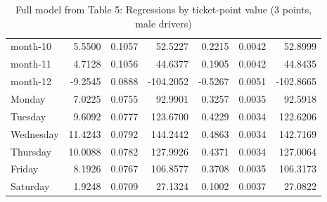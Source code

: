 \documentclass[10pt]{article}
\begin{document}
\begin{table}[ht]
\begin{tabular}{lrrrrrr}
  month-10 & 5.5500 & 0.1057 & 52.5227 & 0.2215 & 0.0042 & 52.8999 \\ 
  month-11 & 4.7128 & 0.1056 & 44.6377 & 0.1905 & 0.0042 & 44.8435 \\ 
  month-12 & -9.2545 & 0.0888 & -104.2052 & -0.5267 & 0.0051 & -102.8665 \\ 
  Monday & 7.0225 & 0.0755 & 92.9901 & 0.3257 & 0.0035 & 92.5918 \\ 
  Tuesday & 9.6092 & 0.0777 & 123.6700 & 0.4229 & 0.0034 & 122.6206 \\ 
  Wednesday & 11.4243 & 0.0792 & 144.2442 & 0.4863 & 0.0034 & 142.7169 \\ 
  Thursday & 10.0088 & 0.0782 & 127.9926 & 0.4371 & 0.0034 & 127.0064 \\ 
  Friday & 8.1926 & 0.0767 & 106.8577 & 0.3708 & 0.0035 & 106.3173 \\ 
  Saturday & 1.9248 & 0.0709 & 27.1324 & 0.1002 & 0.0037 & 27.0822 \\ 
   \hline
\end{tabular}
\caption{Full model from Table 5: Regressions by ticket-point value (3 points, male drivers)} 
\label{tab_5_3_pts_no_age_M}
\end{table}


\clearpage
\pagebreak



\end{document}
